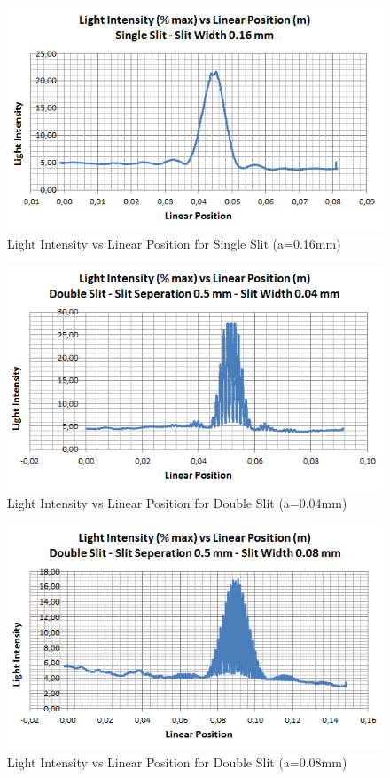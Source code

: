 \documentclass[a4paper,12pt]{report}
\begin{document}
\begin{figure}[h]
\centering
\includegraphics[width=1.0\linewidth, height=0.39\textheight]{2}
\caption{Light Intensity vs Linear Position for Single Slit (a=0.16mm)}
\label{fig:2}
\end{figure}
\begin{figure}[h]
\centering
\includegraphics[width=1.0\linewidth, height=0.39\textheight]{3}
\caption{Light Intensity vs Linear Position for Double Slit (a=0.04mm)}
\label{fig:3}
\end{figure}
\begin{figure}[h]
\centering
\includegraphics[width=1.0\linewidth, height=0.39\textheight]{4}
\caption{Light Intensity vs Linear Position for Double Slit (a=0.08mm)}
\label{fig:4}
\end{figure}
\end{document}
